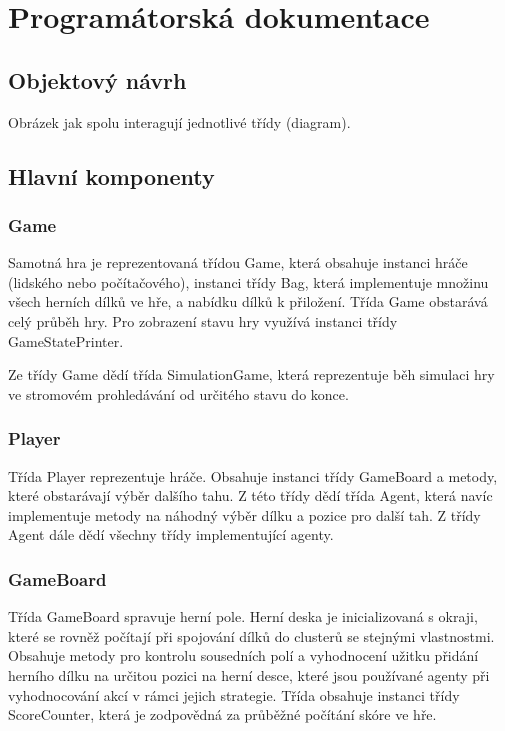 \chapter{Programátorská dokumentace}


\section{Objektový návrh}

Obrázek jak spolu interagují jednotlivé třídy (diagram).

\section{Hlavní komponenty}
\subsection{Game}
Samotná hra je reprezentovaná třídou Game, která obsahuje instanci hráče (lidského nebo počítačového), instanci třídy Bag, která implementuje množinu všech herních dílků ve hře, a nabídku dílků k přiložení. Třída Game obstarává celý průběh hry. Pro zobrazení stavu hry využívá instanci třídy GameStatePrinter. 

Ze třídy Game dědí třída SimulationGame, která reprezentuje běh simulaci hry ve stromovém prohledávání od určitého stavu do konce.

\subsection{Player}
Třída Player reprezentuje hráče. Obsahuje instanci třídy GameBoard a metody, které obstarávají výběr dalšího tahu.
Z této třídy dědí třída Agent, která navíc implementuje metody na náhodný výběr dílku a pozice pro další tah.
Z třídy Agent dále dědí všechny třídy implementující agenty.

\subsection{GameBoard}
Třída GameBoard spravuje herní pole. Herní deska je inicializovaná s okraji, které se rovněž počítají při spojování dílků do clusterů se stejnými vlastnostmi.
Obsahuje metody pro kontrolu sousedních polí a vyhodnocení užitku přidání herního dílku na určitou pozici na herní desce, které jsou používané agenty při vyhodnocování akcí v rámci jejich strategie. Třída obsahuje instanci třídy ScoreCounter, která je zodpovědná za průběžné počítání skóre ve hře.

